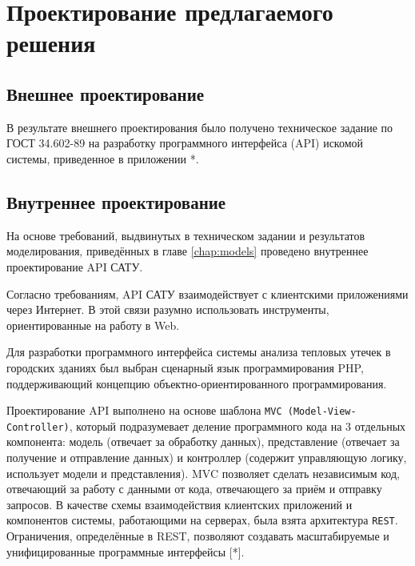 \chapter{Проектирование предлагаемого решения}

\section{Внешнее проектирование}

\par
	В результате внешнего проектирования было получено техническое задание по ГОСТ 34.602-89 на разработку программного интерфейса (API) искомой системы, приведенное в приложении *.

\section{Внутреннее проектирование}

\par

	На основе требований, выдвинутых в техническом задании и результатов моделирования, приведённых в главе \ref{chap:models} проведено внутреннее проектирование API САТУ.

	Согласно требованиям, API САТУ взаимодействует с клиентскими приложениями через Интернет. В этой связи разумно использовать инструменты, ориентированные на работу в Web.

	Для разработки программного интерфейса системы анализа тепловых утечек в городских зданиях был выбран сценарный язык программирования PHP, поддерживающий концепцию объектно-ориентированного программирования.

\par

	Проектирование API выполнено на основе шаблона \texttt{MVC (Model-View-Controller)}, который подразумевает деление программного кода на 3 отдельных компонента: модель (отвечает за обработку данных), представление (отвечает за получение и отправление данных) и контроллер (содержит управляющую логику, использует модели и представления). MVC позволяет сделать независимым код, отвечающий за работу с данными от кода, отвечающего за приём и отправку запросов.
	В качестве схемы взаимодействия клиентских приложений и компонентов системы, работающими на серверах, была взята архитектура \texttt{REST}. Ограничения, определённые в REST, позволяют создавать масштабируемые и унифицированные программные интерфейсы [*]. \\


